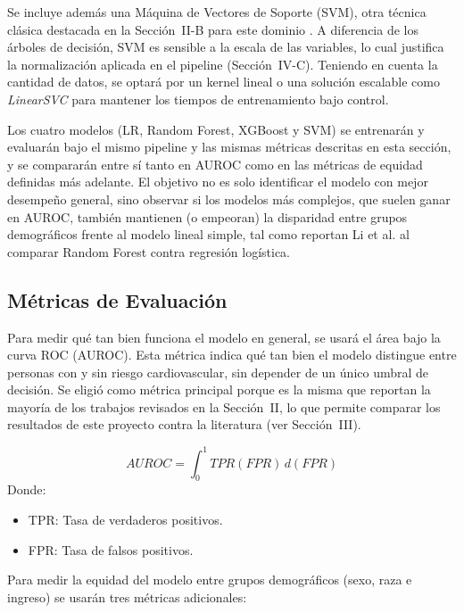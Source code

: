 \documentclass[conference]{IEEEtran}
\begin{document}
Se incluye además una Máquina de Vectores de Soporte (SVM), otra técnica clásica destacada en la Sección~II-B para este dominio \cite{li2023evaluating, davoudi2024fairness}. A diferencia de los árboles de decisión, SVM es sensible a la escala de las variables, lo cual justifica la normalización aplicada en el pipeline (Sección~IV-C). Teniendo en cuenta la cantidad de datos, se optará por un kernel lineal o una solución escalable como  \textit{LinearSVC} para mantener los tiempos de entrenamiento bajo control.

Los cuatro modelos (LR, Random Forest, XGBoost y SVM) se entrenarán y evaluarán bajo el mismo pipeline y las mismas métricas descritas en esta sección, y se compararán entre sí tanto en AUROC como en las métricas de equidad definidas más adelante. El objetivo no es solo identificar el modelo con mejor desempeño general, sino observar si los modelos más complejos, que suelen ganar en AUROC, también mantienen (o empeoran) la disparidad entre grupos demográficos frente al modelo lineal simple, tal como reportan Li et al. \cite{li2023evaluating} al comparar Random Forest contra regresión logística.

\subsection{Métricas de Evaluación}
\label{subsec:metricas}

Para medir qué tan bien funciona el modelo en general, se usará el área bajo la curva ROC (AUROC). Esta métrica indica qué tan bien el modelo distingue entre personas con y sin riesgo cardiovascular, sin depender de un único umbral de decisión. Se eligió como métrica principal porque es la misma que reportan la mayoría de los trabajos revisados en la Sección~II, lo que permite comparar los resultados de este proyecto contra la literatura (ver Sección~III).

\[
AUROC = \int_{0}^{1} TPR(FPR) \, d(FPR)
\]
Donde:
\begin{itemize}
\item TPR: Tasa de verdaderos positivos.
\item FPR: Tasa de falsos positivos.
\end{itemize}

Para medir la equidad del modelo entre grupos demográficos (sexo, raza e ingreso) se usarán tres métricas adicionales:
\end{document}
